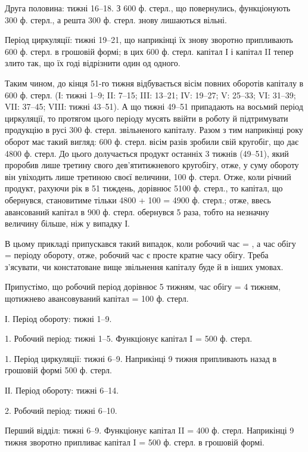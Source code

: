 Друга половина: тижні 16--18. З 600 ф. стерл., що повернулись,
функціонують 300 ф. стерл., а решта 300 ф. стерл. знову лишаються
вільні.

Період циркуляції: тижні 19--21, що наприкінці їх знову зворотно
припливають 600 ф. стерл. в грошовій формі; в цих 600 ф. стерл.
капітал І і капітал II тепер злито так, що їх годі відрізнити один од одного.

Таким чином, до кінця 51-го тижня відбувається вісім повних оборотів
капіталу в 600 ф. стерл. (І: тижні 1--9; II: 7--15; III: 13--21;
IV: 19--27; V: 25--33; VI: 31--39; VII: 37--45; VIII: тижні
43--51). А що тижні 49--51 припадають на восьмий період циркуляції,
то протягом цього періоду мусять ввійти в роботу й підтримувати
продукцію в русі 300 ф. стерл. звільненого капіталу. Разом з тим наприкінці
року оборот має такий вигляд: 600 ф. стерл. вісім разів зробили
свій кругобіг, що дає 4800 ф. стерл. До цього долучається продукт
останніх 3 тижнів (49--51), який проробив лише третину свого дев’ятитижневого
кругобігу, отже, у суму обороту він увіходить лише третиною
своєї величини, 100 ф. стерл. Отже, коли річний продукт, рахуючи рік в
51 тиждень, дорівнює 5100 ф. стерл., то капітал, що обернувся, становитиме
тільки 4800 + 100 = 4900 ф. стерл.; отже, ввесь авансований капітал
в 900 ф. стерл. обернувся 5 раза, тобто на незначну величину більше,
ніж у випадку І.

В цьому прикладі припускався такий випадок, коли робочий час = ,
а час обігу =  періоду обороту, отже, робочий час є просте кратне
часу обігу. Треба з’ясувати, чи констатоване вище звільнення капіталу
буде й в інших умовах.

Припустімо, що робочий період дорівнює 5 тижням, час обігу = 4 тижням,
щотижнево авансовуваний капітал = 100 ф. стерл.

І. Період обороту: тижні 1--9.

1. Робочий період: тижні 1--5. Функціонує капітал I = 500 ф. стерл.

1. Період циркуляції: тижні 6--9. Наприкінці 9 тижня припливають
назад в грошовій формі 500 ф. стерл.

ІІ. Період обороту: тижні 6--14.

2. Робочий період: тижні 6--10.

Перший відділ: тижні 6--9. Функціонує капітал II = 400 ф. стерл.
Наприкінці 9 тижня зворотно припливає капітал I = 500 ф. стерл. в грошовій
формі.

